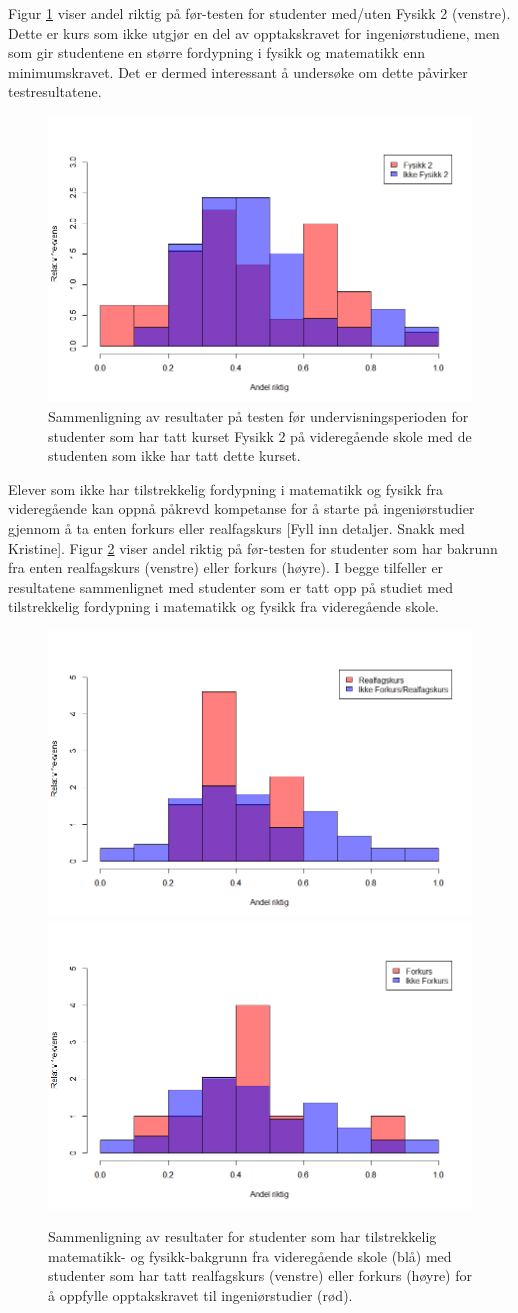 \documentclass[a4paper,norsk,12pt]{article}
\begin{document}
Figur \ref{fig:fysmat} viser andel riktig på før-testen for studenter med/uten Fysikk 2 (venstre). Dette er kurs som ikke utgjør en del av opptakskravet for ingeniørstudiene, men som gir studentene en større fordypning i fysikk og matematikk enn minimumskravet. Det er dermed interessant å undersøke om dette påvirker testresultatene.
\begin{figure}[p]
\begin{center}
	\includegraphics[width=.48\textwidth]{./fys2}
\end{center}
	\caption{Sammenligning av resultater på testen før undervisningsperioden for studenter som har tatt kurset Fysikk 2 på videregående skole med de studenten som ikke har tatt dette kurset.}
	\label{fig:fysmat}
\end{figure}

Elever som ikke har tilstrekkelig fordypning i matematikk og fysikk fra videregående kan oppnå påkrevd kompetanse for å starte på ingeniørstudier gjennom å ta enten forkurs eller realfagskurs {\color{red}[Fyll inn detaljer. Snakk med Kristine]}. Figur \ref{fig:forkurs} viser andel riktig på før-testen for studenter som har bakrunn fra enten realfagskurs (venstre) eller forkurs (høyre). I begge tilfeller er resultatene sammenlignet med studenter som er tatt opp på studiet med tilstrekkelig fordypning i matematikk og fysikk fra videregående skole.
\begin{figure}[p]
	\includegraphics[width=.48\textwidth]{./real}
	\includegraphics[width=.48\textwidth]{./forkurs}
	\caption{ Sammenligning av resultater for studenter som har tilstrekkelig matematikk- og fysikk-bakgrunn fra videregående skole (blå) med studenter som har tatt realfagskurs (venstre) eller forkurs (høyre) for å oppfylle opptakskravet til ingeniørstudier (rød).}
	\label{fig:forkurs}
\end{figure}
\end{document}
